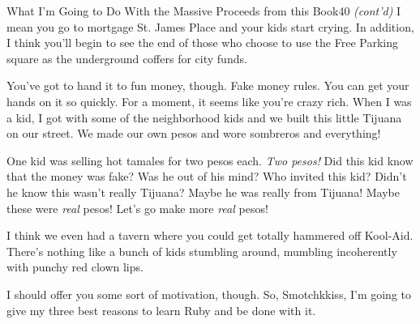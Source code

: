 \documentclass[12pt,twoside]{report}
\begin{document}
	\begin{sidebar}{What I'm Going to Do With the Massive Proceeds from this Book}{40}
	\textit{(cont'd)}
	I mean you go to mortgage St. James Place and your kids start crying. In addition, I think you'll begin to see the end of those who choose to use the Free Parking square as the underground coffers for city funds.\vspace{6pt}

	You've got to hand it to fun money, though. Fake money rules. You can get your hands on it so quickly. For a moment, it seems like you're crazy rich. When I was a kid, I got with some of the neighborhood kids and we built this little Tijuana on our street. We made our own pesos and wore sombreros and everything!\vspace{6pt}

	One kid was selling hot tamales for two pesos each. \textit{Two pesos!} Did this kid know that the money was fake? Was he out of his mind? Who invited this kid? Didn't he know this wasn't really Tijuana? Maybe he was really from Tijuana! Maybe these were \textit{real} pesos! Let's go make more \textit{real} pesos!\vspace{6pt}

	I think we even had a tavern where you could get totally hammered off Kool-Aid. There's nothing like a bunch of kids stumbling around, mumbling incoherently with punchy red clown lips.
	\end{sidebar}

I should offer you some sort of motivation, though. So, Smotchkkiss,
I'm going to give my three best reasons to learn Ruby and be done with
it.
\end{document}

